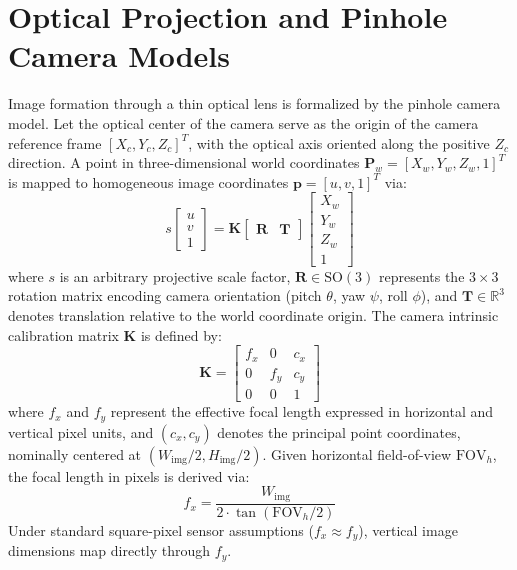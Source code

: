 \documentclass[12pt,a4paper,oneside]{report}
\begin{document}
\section{Optical Projection and Pinhole Camera Models}
Image formation through a thin optical lens is formalized by the pinhole camera model. Let the optical center of the camera serve as the origin of the camera reference frame $[X_c, Y_c, Z_c]^T$, with the optical axis oriented along the positive $Z_c$ direction. A point in three-dimensional world coordinates $\mathbf{P}_w = [X_w, Y_w, Z_w, 1]^T$ is mapped to homogeneous image coordinates $\mathbf{p} = [u, v, 1]^T$ via:
\begin{equation}
s \begin{bmatrix} u \\ v \\ 1 \end{bmatrix} = \mathbf{K} \begin{bmatrix} \mathbf{R} & \mathbf{T} \end{bmatrix} \begin{bmatrix} X_w \\ Y_w \\ Z_w \\ 1 \end{bmatrix}
\end{equation}
where $s$ is an arbitrary projective scale factor, $\mathbf{R} \in \text{SO}(3)$ represents the $3 \times 3$ rotation matrix encoding camera orientation (pitch $\theta$, yaw $\psi$, roll $\phi$), and $\mathbf{T} \in \mathbb{R}^3$ denotes translation relative to the world coordinate origin. The camera intrinsic calibration matrix $\mathbf{K}$ is defined by:
\begin{equation}
\mathbf{K} = \begin{bmatrix} f_x & 0 & c_x \\ 0 & f_y & c_y \\ 0 & 0 & 1 \end{bmatrix}
\end{equation}
where $f_x$ and $f_y$ represent the effective focal length expressed in horizontal and vertical pixel units, and $(c_x, c_y)$ denotes the principal point coordinates, nominally centered at $(W_{\text{img}}/2, H_{\text{img}}/2)$. Given horizontal field-of-view $\text{FOV}_h$, the focal length in pixels is derived via:
\begin{equation}
f_x = \frac{W_{\text{img}}}{2 \cdot \tan(\text{FOV}_h / 2)}
\end{equation}
Under standard square-pixel sensor assumptions ($f_x \approx f_y$), vertical image dimensions map directly through $f_y$.
\end{document}
